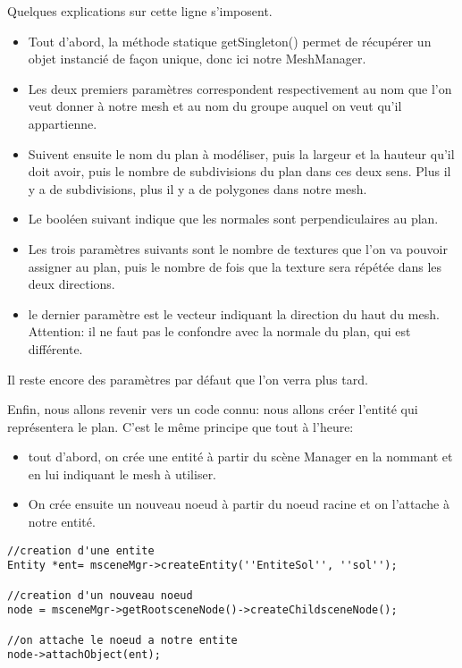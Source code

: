 Quelques explications sur cette ligne s'imposent. 
\begin{itemize}
\item Tout d'abord, la m\'ethode statique getSingleton() permet de r\'ecup\'erer un objet instanci\'e de fa\c{c}on unique, donc ici notre MeshManager.
\item Les deux premiers param\`etres correspondent respectivement au nom que l'on veut donner \`{a} notre mesh et au nom du groupe auquel on veut qu'il appartienne. 
\item Suivent ensuite le nom du plan \`{a} mod\'eliser, puis la largeur et la hauteur qu'il doit avoir, puis le nombre de subdivisions du plan dans ces deux sens. Plus il y a de subdivisions, plus il y a de polygones dans notre mesh. 
\item Le bool\'een suivant indique que les normales sont perpendiculaires au plan.
\item Les trois param\`etres suivants sont le nombre de textures que l'on va pouvoir assigner au plan, puis le nombre de fois que la texture sera r\'ep\'et\'ee dans les deux directions. 
\item le dernier param\`etre est le vecteur indiquant la direction du haut du mesh. Attention: il ne faut pas le confondre avec la normale du plan, qui est diff\'erente.
\end{itemize}

Il reste encore des param\`etres par d\'efaut que l'on verra plus tard.

Enfin, nous allons revenir vers un code connu: nous allons cr\'eer l'entit\'e qui repr\'esentera le plan. C'est le m\^eme principe que tout \`{a} l'heure:
\begin{itemize} 
\item tout d'abord, on cr\'ee une entit\'e \`{a} partir du sc\`ene Manager en la nommant et en lui indiquant le mesh \`{a} utiliser. 
\item On cr\'ee ensuite un nouveau noeud \`{a} partir du noeud racine et on l'attache \`{a} notre entit\'e.
\end{itemize}

\begin{lstlisting}
//creation d'une entite
Entity *ent= msceneMgr->createEntity(''EntiteSol'', ''sol'');

//creation d'un nouveau noeud
node = msceneMgr->getRootsceneNode()->createChildsceneNode();

//on attache le noeud a notre entite
node->attachObject(ent);
\end{lstlisting}





